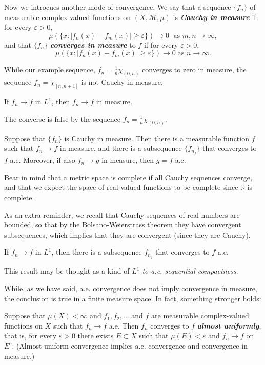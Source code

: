 \documentclass{article}
\theoremstyle{definition}
\numberwithin{equation}{section}
\newcommand{\R}{\mathbb{R}}
\begin{document}
		Now we introcues another mode of convergence. We say that a sequence $\{f_n\}$ of measurable complex-valued functions on $(X,\mathcal{M},\mu)$ is \textbf{\textit{Cauchy in measure}} if for every $\varepsilon>0$, 
		\[\mu(\{x:|f_n(x)-f_m(x)|\geq\varepsilon\})\to0\;\text{ as }m,n\to\infty,\]
		and that $\{f_n\}$ \textbf{\textit{converges in measure}} to $f$ if for every $\varepsilon>0$,
		\[\mu(\{x:|f_n(x)-f_m(x)|\geq\varepsilon\})\to0\;\text{as }n\to\infty.\]
		
		While our example sequence, $f_n=\frac{1}{n}\chi_{(0,n)}$ converges to zero in measure, the sequence $f_n=\chi_{[n,n+1]}$ is not Cauchy in measure.
		
		\begin{prop}
			If $f_n\to f$ in $L^1$, then $f_n\to f$ in measure.
		\end{prop}
		\begin{remark}
			The converse is false by the sequence $f_n=\frac{1}{n}\chi_{(0,n)}$.
		\end{remark}
		\begin{thm}
			Suppose that $\{f_n\}$ is Cauchy in measure. Then there is a measurable function $f$ such that $f_n\to f$ in measure, and there is a subsequence $\{f_{n_j}\}$ that converges to $f$ a.e. Moreover, if also $f_n\to g$ in measure, then $g=f$ a.e.
		\end{thm}
		\begin{remark}
			Bear in mind that a metric space is complete if all Cauchy sequences converge, and that we expect the space of real-valued functions to be complete since $\R$ is complete.
		\end{remark}
		\begin{remark}
			As an extra reminder, we recall that Cauchy sequences of real numbers are bounded, so that by the Bolsano-Weierstrass theorem they have convergent subsequences, which implies that they are convergent (since they are Cauchy).
		\end{remark}
		\begin{thm}
			If $f_n\to f$ in $L^1$, then there is a subsequence $f_{n_j}$ that converges to $f$ a.e.
		\end{thm}
		\begin{remark}
			This result may be thought as a kind of \textit{$L^1$-to-a.e. sequential compactness}.
		\end{remark}
		While, as we have said, a.e. convergence does not imply convergence in measure, the conclusion is true in a finite measure space. In fact, something stronger holds:
		\begin{thm}[Egoroff]
			Suppose that $\mu(X)<\infty$ and $f_1,f_2,\ldots$ and $f$ are measurable complex-valued functions on $X$ such that $f_n\to f$ a.e. Then $f_n$ converges to $f$ \textbf{\textit{almost uniformly}}, that is, for every $\varepsilon>0$ there exists $E\subset X$ such that $\mu(E)<\varepsilon$ and $f_n\to f$ on $E^c$. (Almost uniform convergence implies a.e. convergence and convergence in measure.)
		\end{thm}
\end{document}
